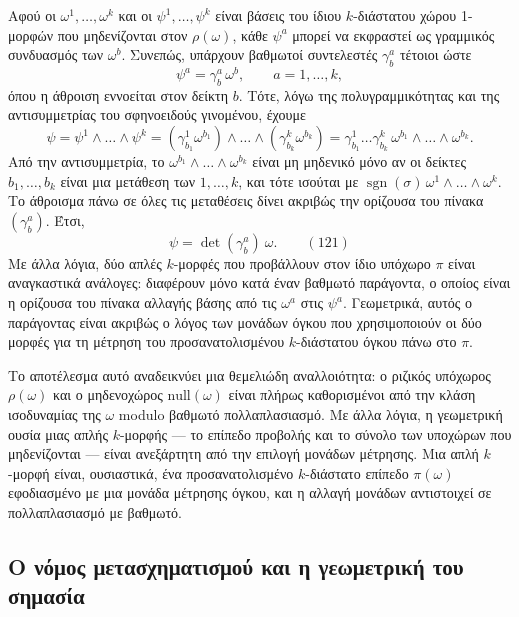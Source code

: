 \documentclass[12pt]{article}
\begin{document}
Αφού οι $\omega^1, \dots, \omega^k$ και οι $\psi^1, \dots, \psi^k$ είναι βάσεις του ίδιου $k$-διάστατου χώρου 1-μορφών που μηδενίζονται στον $\rho(\omega)$, κάθε $\psi^a$ μπορεί να εκφραστεί ως γραμμικός συνδυασμός των $\omega^b$. Συνεπώς, υπάρχουν βαθμωτοί συντελεστές $\gamma^a_b$ τέτοιοι ώστε
\[
\psi^a = \gamma^a_b \, \omega^b, \qquad a = 1, \dots, k,
\]
όπου η άθροιση εννοείται στον δείκτη $b$. Τότε, λόγω της πολυγραμμικότητας και της αντισυμμετρίας του σφηνοειδούς γινομένου, έχουμε
\[
\psi = \psi^1 \wedge \dots \wedge \psi^k = (\gamma^1_{b_1} \omega^{b_1}) \wedge \dots \wedge (\gamma^k_{b_k} \omega^{b_k}) = \gamma^1_{b_1} \dots \gamma^k_{b_k} \, \omega^{b_1} \wedge \dots \wedge \omega^{b_k}.
\]
Από την αντισυμμετρία, το $\omega^{b_1} \wedge \dots \wedge \omega^{b_k}$ είναι μη μηδενικό μόνο αν οι δείκτες $b_1, \dots, b_k$ είναι μια μετάθεση των $1, \dots, k$, και τότε ισούται με $\operatorname{sgn}(\sigma) \, \omega^1 \wedge \dots \wedge \omega^k$. Το άθροισμα πάνω σε όλες τις μεταθέσεις δίνει ακριβώς την ορίζουσα του πίνακα $(\gamma^a_b)$. Έτσι,
\begin{equation}
\psi = \det(\gamma^a_b) \ \omega. \qquad (121)
\end{equation}
Με άλλα λόγια, δύο απλές $k$-μορφές που προβάλλουν στον ίδιο υπόχωρο $\pi$ είναι αναγκαστικά ανάλογες: διαφέρουν μόνο κατά έναν βαθμωτό παράγοντα, ο οποίος είναι η ορίζουσα του πίνακα αλλαγής βάσης από τις $\omega^a$ στις $\psi^a$. Γεωμετρικά, αυτός ο παράγοντας είναι ακριβώς ο λόγος των μονάδων όγκου που χρησιμοποιούν οι δύο μορφές για τη μέτρηση του προσανατολισμένου $k$-διάστατου όγκου πάνω στο $\pi$.

Το αποτέλεσμα αυτό αναδεικνύει μια θεμελιώδη αναλλοιότητα: ο ριζικός υπόχωρος $\rho(\omega)$ και ο μηδενοχώρος $\text{null}(\omega)$ είναι πλήρως καθορισμένοι από την κλάση ισοδυναμίας της $\omega$ modulo βαθμωτό πολλαπλασιασμό. Με άλλα λόγια, η γεωμετρική ουσία μιας απλής $k$-μορφής — το επίπεδο προβολής και το σύνολο των υποχώρων που μηδενίζονται — είναι ανεξάρτητη από την επιλογή μονάδων μέτρησης. Μια απλή $k$-μορφή είναι, ουσιαστικά, ένα προσανατολισμένο $k$-διάστατο επίπεδο $\pi(\omega)$ εφοδιασμένο με μια μονάδα μέτρησης όγκου, και η αλλαγή μονάδων αντιστοιχεί σε πολλαπλασιασμό με βαθμωτό.

\subsection{Ο νόμος μετασχηματισμού και η γεωμετρική του σημασία}
\end{document}
